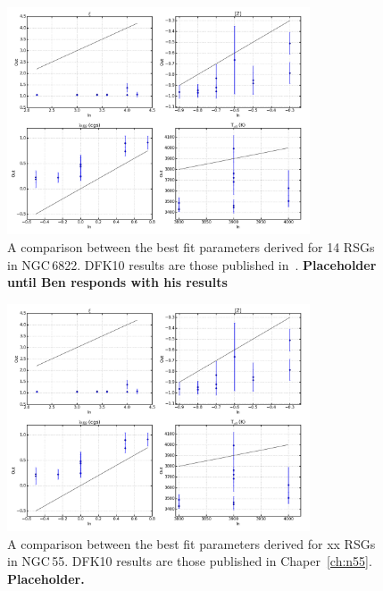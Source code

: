 \begin{figure}
 \centering
 \includegraphics[width=0.80\textwidth]{JAnal/Fakespec-t2-v1}
 \caption[NGC\,6822 DFK10 best fit parameter comparison]{
A comparison between the best fit parameters derived for 14 RSGs in NGC\,6822.
DFK10 results are those published in~\cite{2016arXiv160202702P}.
\textbf{Placeholder until Ben responds with his results}
\label{fig:n6822DFK}
         }
\end{figure}

\begin{figure}
 \centering
 \includegraphics[width=0.80\textwidth]{JAnal/Fakespec-t2-v1}
 \caption[NGC\,55 DFK10 best fit parameter comparison]{
A comparison between the best fit parameters derived for xx RSGs in NGC\,55.
DFK10 results are those published in Chaper~\ref{ch:n55}.
\textbf{Placeholder.}
\label{fig:n55DFK}
         }
\end{figure}

